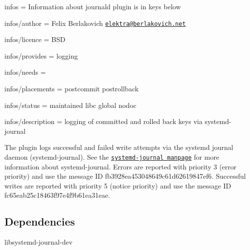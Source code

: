 
\begin{DoxyItemize}
\item infos = Information about journald plugin is in keys below
\item infos/author = Felix Berlakovich \href{mailto:elektra@berlakovich.net}{\tt elektra@berlakovich.\+net}
\item infos/licence = B\+SD
\item infos/provides = logging
\item infos/needs =
\item infos/placements = postcommit postrollback
\item infos/status = maintained libc global nodoc
\item infos/description = logging of committed and rolled back keys via systemd-\/journal
\end{DoxyItemize}

The plugin logs successful and failed write attempts via the systemd journal daemon (systemd-\/journal). See the \href{http://www.freedesktop.org/software/systemd/man/systemd-journald.service.html}{\tt systemd-\/journal manpage} for more information about systemd-\/journal. Errors are reported with priority 3 (error priority) and use the message ID {\ttfamily fb3928ea453048649c61d62619847ef6}. Successful writes are reported with priority 5 (notice priority) and use the message ID {\ttfamily fc65eab25c18463f97e4f9b61ea31eae}.

\subsection*{Dependencies}


\begin{DoxyItemize}
\item {\ttfamily libsystemd-\/journal-\/dev} 
\end{DoxyItemize}